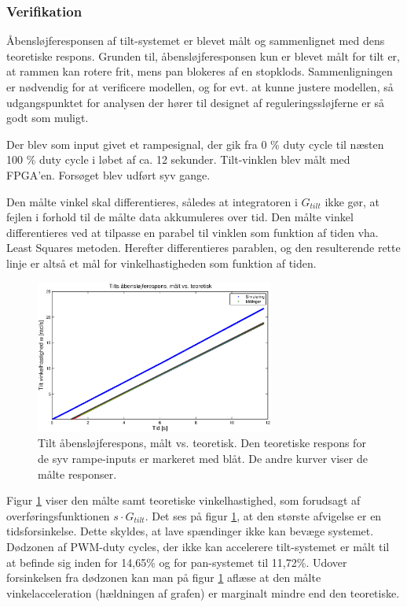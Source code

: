\subsubsection{Verifikation}
\label{subsec:verifikation}
Åbensløjferesponsen af tilt-systemet er blevet målt og sammenlignet med dens teoretiske respons.
Grunden til, åbensløjferesponsen kun er blevet målt for tilt er, at rammen kan rotere frit,
mens pan blokeres af en stopklods.
Sammenligningen er nødvendig for at verificere modellen, og for evt. at kunne justere modellen,
så udgangspunktet for analysen der hører til designet af reguleringssløjferne er så godt som muligt.

Der blev som input givet et rampesignal, der gik fra 0 \% duty cycle til næsten 100 \% duty cycle
i løbet af ca. 12 sekunder. Tilt-vinklen blev målt med FPGA'en.
Forsøget blev udført syv gange.

Den målte vinkel skal differentieres, således at integratoren i \(G_{tilt}\) ikke gør,
at fejlen i forhold til de målte data akkumuleres over tid.
Den målte vinkel differentieres ved at tilpasse en parabel
til vinklen som funktion af tiden vha. Least Squares metoden. Herefter differentieres
parablen, og den resulterende rette linje er altså et mål for vinkelhastigheden som funktion af tiden.

\begin{figure}[th!]
	\centering
	\includegraphics[width=0.7\textwidth]{./graphics/openloopVelocity1.eps}
	\caption[Tilt åbensløjferespons, målt vs. teoretisk]
		{Tilt åbensløjferespons, målt vs. teoretisk.
		Den teoretiske respons for de syv rampe-inputs er markeret med blåt.
		De andre kurver viser de målte responser.}
	\label{fig:openloopV1}
\end{figure}

Figur \ref{fig:openloopV1} viser den målte samt teoretiske vinkelhastighed,
som forudsagt af overføringsfunktionen \(s\cdot{}G_{tilt}\).
Det ses på figur \ref{fig:openloopV1}, at den største afvigelse er en tidsforsinkelse.
Dette skyldes, at lave spændinger ikke kan bevæge systemet.
Dødzonen af PWM-duty cycles, der ikke kan accelerere tilt-systemet er målt til at befinde sig inden for 14,65\% og for pan-systemet til 11,72\%.
Udover forsinkelsen fra dødzonen kan man på figur \ref{fig:openloopV1} aflæse
at den målte vinkelacceleration (hældningen af grafen) er marginalt mindre end den teoretiske.

